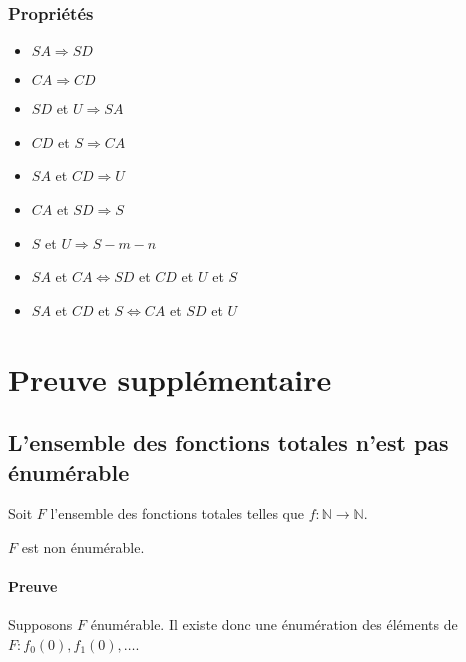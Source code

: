 \subsection{Propriétés}

\begin{itemize}
\item $SA \Rightarrow SD$
\item $CA \Rightarrow CD$
\item $SD$ et $U \Rightarrow SA$
\item $CD$ et $S \Rightarrow CA$
\item $SA$ et $CD \Rightarrow U$
\item $CA$ et $SD \Rightarrow S$
\item $S$ et $U \Rightarrow S-m-n$
\item $SA$ et $CA \Leftrightarrow SD$ et $CD$ et $U$ et $S$
\item $SA$ et $CD$ et $S \Leftrightarrow CA$ et $SD$ et $U$
\end{itemize}

\chapter{Preuve supplémentaire}

\section{L'ensemble des fonctions totales n'est pas énumérable}\label{sec:ensembleF}

Soit $F$ l'ensemble des fonctions totales telles que $f : \mathbb{N} \rightarrow \mathbb{N}$.

$F$ est non énumérable.

\subsubsection*{Preuve}

Supposons $F$ énumérable. Il existe donc une énumération des éléments de $F : f_0(0), f_1(0), \ldots$.

